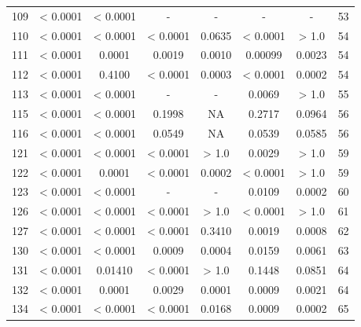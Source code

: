 {\begin{longtable}{cccccccc}
109 & {\color{red} < 0.0001} & {\color{red} < 0.0001} & - & - & - & - & 53 \\
110 & {\color{red} < 0.0001} & {\color{red} < 0.0001} & {\color{red} < 0.0001} & 0.0635 & {\color{red} < 0.0001} & > 1.0 & 54 \\
111 & {\color{red} < 0.0001} & {\color{red}0.0001} & {\color{red}0.0019} & {\color{red}0.0010} & {\color{red}0.00099} & {\color{red}0.0023} & 54 \\
112 & {\color{red} < 0.0001} & {\color{red}0.4100} & {\color{red} < 0.0001} & {\color{red}0.0003} & {\color{red} < 0.0001} & {\color{red}0.0002} & 54 \\
113 & {\color{red} < 0.0001} & {\color{red} < 0.0001} & - & - & {\color{red}0.0069} & > 1.0 & 55 \\
115 & {\color{red} < 0.0001} & {\color{red} < 0.0001} & 0.1998 & NA & 0.2717 & 0.0964 & 56 \\
116 & {\color{red} < 0.0001} & {\color{red} < 0.0001} & 0.0549 & NA & 0.0539 & 0.0585 & 56 \\
121 & {\color{red} < 0.0001} & {\color{red} < 0.0001} & {\color{red} < 0.0001} & > 1.0 & {\color{red}0.0029} & > 1.0 & 59 \\
122 & {\color{red} < 0.0001} & {\color{red}0.0001} & {\color{red} < 0.0001} & {\color{red}0.0002} & {\color{red} < 0.0001} & > 1.0 & 59 \\
123 & {\color{red} < 0.0001} & {\color{red} < 0.0001} & - & - & {\color{red}0.0109} & {\color{red}0.0002} & 60 \\
126 & {\color{red} < 0.0001} & {\color{red} < 0.0001} & {\color{red} < 0.0001} & > 1.0 & {\color{red} < 0.0001} & > 1.0 & 61 \\
127 & {\color{red} < 0.0001} & {\color{red} < 0.0001} & {\color{red} < 0.0001} & 0.3410 & {\color{red}0.0019} & {\color{red}0.0008} & 62 \\
130 & {\color{red} < 0.0001} & {\color{red} < 0.0001} & {\color{red}0.0009} & {\color{red}0.0004} & {\color{red}0.0159} & {\color{red}0.0061} & 63 \\
131 & {\color{red} < 0.0001} & {\color{red}0.01410} & {\color{red} < 0.0001} & > 1.0 & 0.1448 & 0.0851 & 64 \\
132 & {\color{red} < 0.0001} & {\color{red}0.0001} & {\color{red}0.0029} & {\color{red}0.0001} & {\color{red}0.0009} & {\color{red}0.0021} & 64 \\
134 & {\color{red} < 0.0001} & {\color{red} < 0.0001} & {\color{red} < 0.0001} & {\color{red}0.0168} & {\color{red}0.0009} & {\color{red}0.0002} & 65 \\

\end{longtable}}
